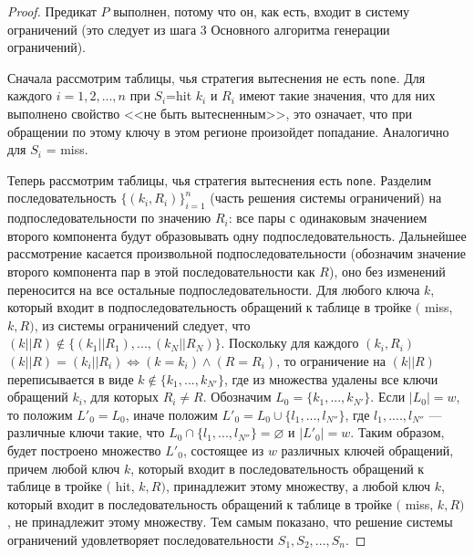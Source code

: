 \begin{theorem}\label{mirror_correctness}
\CorrectnessMirror
\end{theorem}
\begin{proof}
  Предикат $P$ выполнен, потому что он, как есть, входит в систему ограничений (это следует из шага 3 Основного алгоритма генерации ограничений).

  Сначала рассмотрим таблицы, чья стратегия вытеснения не есть \texttt{none}. Для каждого $i = 1, 2, ..., n$ при $S_i${=}hit  $k_i$ и $R_i$ имеют такие значения, что для них выполнено свойство <<не быть вытесненным>>, это означает, что при обращении по этому ключу в этом регионе произойдет попадание. Аналогично для $S_i$ = miss.

  Теперь рассмотрим таблицы, чья стратегия вытеснения есть \texttt{none}. Разделим последовательность $\{(k_i, R_i)\}_{i=1}^n$ (часть решения системы ограничений) на подпоследовательности по значению $R_i$: все пары с одинаковым значением второго компонента будут образовывать одну подпоследовательность. Дальнейшее рассмотрение касается произвольной подпоследовательности (обозначим значение второго компонента пар в этой последовательности как $R$), оно без изменений переносится на все остальные подпоследовательности. Для любого ключа $k$, который входит в подпоследовательность обращений к таблице в тройке $($ miss, $k, R)$, из системы ограничений следует, что $(k||R) \notin \{(k_1||R_1), ..., (k_N||R_N)\}$. Поскольку для каждого $(k_i, R_i)$ $(k||R) = (k_i||R_i) \Leftrightarrow (k = k_i) \wedge (R = R_i)$, то ограничение на $(k||R)$ переписывается в виде $k \notin \{k_1, ..., k_{N'}\}$, где из множества удалены все ключи обращений $k_i$, для которых $R_i \neq R$. Обозначим $L_0 = \{k_1, ..., k_{N'}\}$. Если $|L_0| = w$, то положим $L'_0 = L_0$, иначе положим $L'_0 = L_0 \cup \{l_1, ..., l_{N''}\}$, где $l_1, ...., l_{N''}$ --- различные ключи такие, что $L_0 \cap \{l_1, ..., l_{N''}\} = \varnothing$ и $|L'_0| = w$. Таким образом, будет построено множество $L'_0$, состоящее из $w$ различных ключей обращений, причем любой ключ $k$, который входит в последовательность обращений к таблице в тройке $($ hit, $k, R)$, принадлежит этому множеству, а любой ключ $k$, который входит в последовательность обращений к таблице в тройке $($ miss, $k, R)$, не принадлежит этому множеству. Тем самым показано, что решение системы ограничений удовлетворяет последовательности $S_1, S_2, ..., S_n$.
\end{proof}

